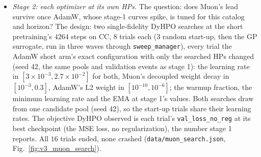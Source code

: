 \documentclass[11pt]{article}
\newcommand{\code}[1]{\texttt{#1}}
\begin{document}
\begin{itemize}
    and $1$ to $10$\,TeV $1.18$, a tie (Muon lower on $50\%$, AdamW on $30\%$; the median error is $2.88$ for AdamW's
    first seed and $3.42$ for Muon's second).
  \item \emph{Stage 2: each optimizer at its own HPs.} The question: does Muon's lead survive once AdamW, whose
    stage-1 curves spike, is tuned for this catalog and horizon? The design: two single-fidelity DyHPO searches at the
    short pretraining's $4264$ steps on CC, $8$ trials each ($3$ random start-up, then the GP surrogate, run in three
    waves through \code{sweep\_manager}), every trial the AdamW short arm's exact configuration with only the searched
    HPs changed (seed 42, the same pools and validation events as stage 1): the learning rate in $[3\times10^{-3},
    2.7\times10^{-2}]$ for both, Muon's decoupled weight decay in $[10^{-3}, 0.3]$, AdamW's L2 weight in
    $[10^{-10}, 10^{-6}]$; the warmup fraction, the minimum learning rate and the EMA at stage 1's values. Both searches
    draw from one candidate pool (seed 42), so the start-up trials share their learning rates. The objective DyHPO
    observed is each trial's \code{val\_loss\_no\_reg} at its best checkpoint (the MSE loss, no regularization), the
    number stage 1 reports. All $16$ trials ended, none crashed (\code{data/muon\_search.json},
    Fig.~\ref{fig:v3_muon_search}).

\end{itemize}
\end{document}
